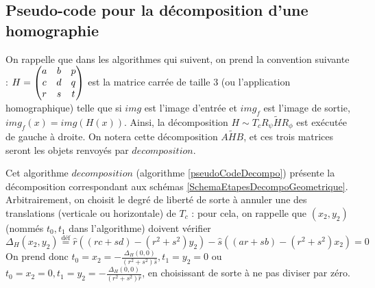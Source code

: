 \subsection{Pseudo-code pour la décomposition d'une homographie}
 
 On rappelle que dans les algorithmes qui suivent, on prend la convention suivante : $H = \begin{pmatrix} a&b&p\\c&d&q\\r&s&t \end{pmatrix}$ est la matrice carrée de taille 3 (ou l'application homographique) telle que si $img$ est l'image d'entrée et $img_f$ est l'image de sortie, $img_f(x) = img(H(x))$. Ainsi, la décomposition $H \sim T_{c} R_{\psi}  \tilde H R_{\phi}$ est exécutée de gauche à droite. On notera cette décomposition $A \tilde H B$, et ces trois matrices seront les objets renvoyés par $decomposition$.
 
 Cet algorithme $decomposition$ (algorithme \ref{pseudoCodeDecompo}) présente la décomposition correspondant aux schémas \ref{SchemaEtapesDecompoGeometrique}. Arbitrairement, on choisit le degré de liberté de sorte à annuler une des translations (verticale ou horizontale) de $T_c$ : pour cela, on rappelle que $(x_2,y_2)$ (nommés $t_0,t_1$ dans l'algorithme) doivent vérifier
 \[\Delta_H(x_2 , y_2 ) \stackrel{\text{déf}}{=} \hat r ((rc+sd)-(r^2 + s^2)y_2) - \hat s ((ar+sb)-(r^2 + s^2 )x_2) = 0 \]
 On prend donc $t_0 = x_2 = -\frac{\Delta_H(0,0)}{(r^2+s^2)\hat s}, t_1 = y_2 = 0$ ou $t_0 = x_2 = 0, t_1 = y_2 = -\frac{\Delta_H(0,0)}{(r^2+s^2)\hat r}$, en choisissant de sorte à ne pas diviser par zéro.
 

